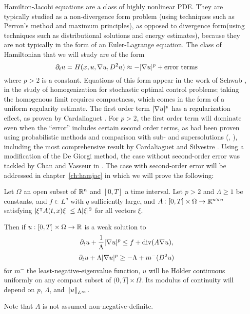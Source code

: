 Hamilton-Jacobi equations are a class of highly nonlinear PDE.  They are typically studied as a non-divergence form problem (using techniques such as Perron's method and maximum principles), as opposed to divergence form(using techniques such as distributional solutions and energy estimates), because they are not typically in the form of an Euler-Lagrange equation.  The class of Hamiltonian that we will study are of the form
\[ \partial_t u = H(x,u,\nabla u, D^2u) \approx -|\nabla u|^p + \textrm{error terms} \]
where $p > 2$ is a constant.  Equations of this form appear in the work of Schwab \cite{Sc.hamjac}, in the study of homogenization for stochastic optimal control problems; taking the homogenous limit requires compactness, which comes in the form of a uniform regularity estimate.  The first order term $|\nabla u|^p$ has a regularization effect, as proven by Cardaliaguet \cite{Ca}.  %
For $p > 2$, the first order term will dominate even when the ``error'' includes certain second order terms, as had been proven using probabilistic methods and comparison with sub- and supersolutions (\cite{CaCa}, \cite{CaRa}), including the most comprehensive result by Cardaliaguet and Silvestre \cite{CaSi.hamjac}.  Using a modification of the De Giorgi method, the case without second-order error was tackled by Chan and Vasseur in \cite{ChVa}.  The case with second-order error will be addressed in chapter~\ref{ch:hamjac} in which we will prove the following:
\begin{theorem}
Let $\Omega$ an open subset of $\mathbb{R}^n$ and $[0,T]$ a time interval.  Let $p > 2$ and $\Lambda \geq 1$ be constants, and $f \in L^q$ with $q$ sufficiently large, and $A:[0,T]\times \Omega \to \mathbb{R}^{n\times n}$ satisfying $\left\lvert \xi^\intercal A(t,x) \xi \right\rvert \leq \Lambda |\xi|^2$ for all vectors $\xi$.  

Then if $u:[0,T]\times\Omega \to \mathbb{R}$ is a weak solution to
\[ \partial_t u + \frac{1}{\Lambda} |\nabla u|^p \leq f + \operatorname{div}(A \nabla u), \]
\[ \partial_t u + \Lambda |\nabla u|^p \geq -\Lambda + m^-(D^2 u) \]
for $m^-$ the least-negative-eigenvalue function, $u$ will be H\"{o}lder continuous uniformly on any compact subset of $(0,T] \times \Omega$.  Its modulus of continuity will depend on $p$, $\Lambda$, and $\left\lVert u\right\rVert_{L^\infty}$.  
\end{theorem}
Note that $A$ is not assumed non-negative-definite.  

